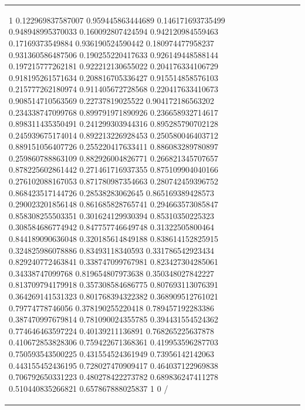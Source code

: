 \documentclass[runningheads]{llncs}\usepackage[]{graphicx}\usepackage[]{color}
\renewcommand{\sparklineheight}{2}
\begin{document}
\begin{table}[ht]
\begin{tabular}{l|p{2.2cm}p{2.2cm}p{2.2cm}p{2.2cm}}
{\begin{sparkline}{10}
\spark 0 1 0.122969837587007 0.959445863444689 0.146171693735499 0.948948995370033 0.160092807424594 0.942120984559463 0.17169373549884 0.936190524590442 0.180974477958237 0.931360586487506 0.190255220417633 0.926149448588144 0.197215777262181 0.922212130655022 0.204176334106729 0.918195261571634 0.208816705336427 0.915514858576103 0.215777262180974 0.911405672728568 0.220417633410673 0.908514710563569 0.22737819025522 0.904172186563202 0.234338747099768 0.899791971890926 0.236658932714617 0.898311435350491 0.241299303944316 0.895285790702128 0.245939675174014 0.892213226928453 0.250580046403712 0.889151056407726 0.255220417633411 0.886083289780897 0.259860788863109 0.882926004826771 0.266821345707657 0.878225602861442 0.271461716937355 0.875109904040166 0.276102088167053 0.871780987354663 0.280742459396752 0.868423517144726 0.28538283062645 0.865169389428573 0.290023201856148 0.861685828765741 0.294663573085847 0.858308255503351 0.301624129930394 0.85310350225323 0.308584686774942 0.847757746649748 0.31322505800464 0.844189090636048 0.320185614849188 0.838614152825915 0.324825986078886 0.83493118340593 0.331786542923434 0.829240772463841 0.338747099767981 0.823427304285061 0.34338747099768 0.819654807973638 0.350348027842227 0.813709794179918 0.357308584686775 0.807693113076391 0.364269141531323 0.801768394322382 0.368909512761021 0.79774778746056 0.378190255220418 0.789457192283386 0.387470997679814 0.781090024355785 0.394431554524362 0.774646463597224 0.40139211136891 0.768265225637878 0.410672853828306 0.759422671368361 0.419953596287703 0.750593543500225 0.431554524361949 0.73956142142063 0.443155452436195 0.728027470909417 0.464037122969838 0.706792650331223 0.480278422273782 0.689836247411278 0.510440835266821 0.657867888025837 1 0 /
\end{sparkline}} & {\renewcommand{\sparklineheight}{3}\definecolor{sparklinecolor}{named}{black}\begin{sparkline}{10}

\end{sparkline}}
\end{tabular}
\end{table}
\end{document}
